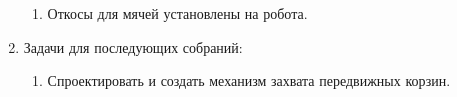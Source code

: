 \begin{enumerate}
\begin{enumerate}
      \item Откосы для мячей установлены на робота.\newline
      
    \end{enumerate}
    
	\item Задачи для последующих собраний:\newline
	\begin{enumerate}
	  \item Спроектировать и создать механизм захвата передвижных корзин.\newline
	  
    \end{enumerate}     
\end{enumerate}

\fillpage
